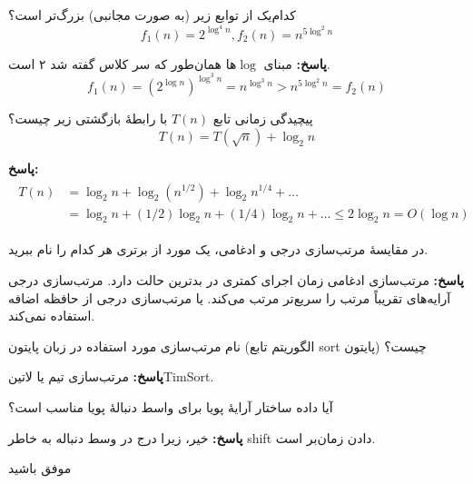 \documentclass[12pt, a4paper]{article}
\newcommand{\پاسخ}[2]{\color{answercolor}\textbf{پاسخ: }#2\color{black}\vspace{-0.3cm}}
\begin{document}
کدام‌یک از توابع زیر (به صورت مجانبی) بزرگ‌تر است؟
\vspace{-0.3cm}
$$f_1(n) = 2^{\log^4 n}, f_2(n) = n^{5\log^2 n}$$

\پاسخ{\vspace{0.5cm}}{
\vspace{-0.5cm}
	مبنای $\log$ها همان‌طور که سر کلاس گفته شد ۲ است.
$$f_1(n) = (2^{\log n})^{\log^3 n} = n^{\log^3 n} > n^{5\log^2 n} = f_2(n)$$
	\vspace{-1cm}
}

پیچیدگی زمانی تابع $T(n)$ با رابطۀ بازگشتی زیر چیست؟
\vspace{-0.3cm}
$$T(n)=T(\sqrt{n})+\log_2 n$$

\پاسخ{\vspace{0.5cm}}{
	\vspace{-1cm}
\begin{align*}
\begin{split}
T(n)&=\log_2 n + \log_2 (n^{1/2}) + \log_2 {n^{1/4}} + \dots \\
&= \log_2 n + (1/2)\log_2 n + (1/4)\log_2 n + \dots \leq 2\log_2 n = O(\log n)
\end{split}
\end{align*}

}

در مقایسۀ مرتب‌سازی درجی و ادغامی، یک مورد از برتری هر کدام را نام ببرید.

\پاسخ{\vspace{1cm}}{
مرتب‌سازی ادغامی زمان اجرای کمتری در بدترین حالت دارد. مرتب‌سازی درجی آرایه‌های تقریباً مرتب را سریع‌تر مرتب می‌کند. یا مرتب‌سازی درجی از حافظه اضافه استفاده نمی‌کند.
	
}

نام مرتب‌سازی مورد استفاده در زبان پایتون (الگوریتم تابع sort پایتون) چیست؟

\پاسخ{\vspace{0.5cm}}{
مرتب‌سازی تیم یا ‌لاتین{TimSort}.

}

آيا داده ساختار آرایۀ پویا برای واسط دنبالۀ پویا مناسب است؟

\پاسخ{\vspace{1.2cm}}{
خیر، زیرا درج در وسط دنباله به خاطر shift دادن زمان‌بر است.
	
}

\begin{flushleft}
موفق باشید
\end{flushleft}
\end{document}
